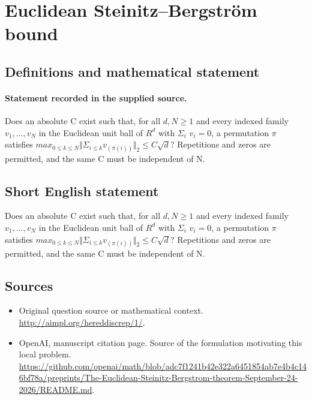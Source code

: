 \documentclass[11pt]{article}
\begin{document}
\section*{Euclidean Steinitz–Bergström bound}\label{statement}
\subsection{Definitions and mathematical statement}
\paragraph{Statement recorded in the supplied source.}
Does an absolute C exist such that, for all $d,N\geq 1$ and every indexed family $v_{1},\dots ,v_N$ in the Euclidean unit ball of $R^{d}$ with $\Sigma _i$ $v_i=0$, a permutation $\pi $ satisfies $max_{0\leq k\leq N}\Vert \Sigma _{i\leq k}v_(\pi (i))\Vert _{2}\leq C\surd d$? Repetitions and zeros are permitted, and the same C must be independent of N.
\subsection{Short English statement}
Does an absolute C exist such that, for all $d,N\geq 1$ and every indexed family $v_{1},\dots ,v_N$ in the Euclidean unit ball of $R^{d}$ with $\Sigma _i$ $v_i=0$, a permutation $\pi $ satisfies $max_{0\leq k\leq N}\Vert \Sigma _{i\leq k}v_(\pi (i))\Vert _{2}\leq C\surd d$? Repetitions and zeros are permitted, and the same C must be independent of N.
\subsection{Sources}
\begin{itemize}
\item[S1] Original question source or mathematical context.
\url{http://aimpl.org/hereddiscrep/1/}.
\item[S2] OpenAI, manuscript citation page. Source of the formulation motivating this local problem.
\url{https://github.com/openai/math/blob/adc7f1241b42e322a6451854ab7e4b4c146bf78a/preprints/The-Euclidean-Steinitz-Bergstrom-theorem-September-24-2026/README.md}.
\end{itemize}
\end{document}
